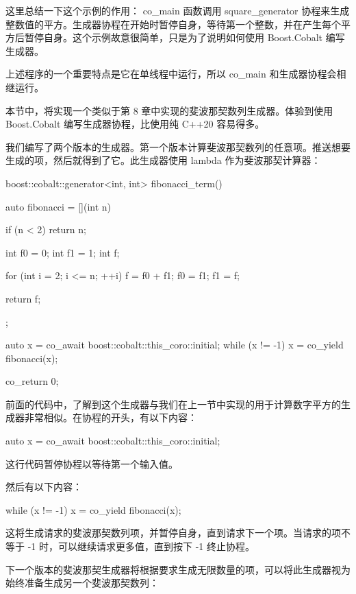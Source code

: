 这里总结一下这个示例的作用： co\_main 函数调用 square\_generator 协程来生成整数值的平方。生成器协程在开始时暂停自身，等待第一个整数，并在产生每个平方后暂停自身。这个示例故意很简单，只是为了说明如何使用 Boost.Cobalt 编写生成器。

上述程序的一个重要特点是它在单线程中运行，所以 co\_main 和生成器协程会相继运行。


本节中，将实现一个类似于第 8 章中实现的斐波那契数列生成器。体验到使用 Boost.Cobalt 编写生成器协程，比使用纯 C++20 容易得多。

我们编写了两个版本的生成器。第一个版本计算斐波那契数列的任意项。推送想要生成的项，然后就得到了它。此生成器使用 lambda 作为斐波那契计算器：

\begin{cpp}
boost::cobalt::generator<int, int> fibonacci_term() {
    auto fibonacci = [](int n) {
        if (n < 2) {
            return n;
        }

        int f0 = 0;
        int f1 = 1;
        int f;

        for (int i = 2; i <= n; ++i) {
            f = f0 + f1;
            f0 = f1;
            f1 = f;
        }

        return f;
    };

    auto x = co_await boost::cobalt::this_coro::initial;
    while (x != -1) {
        x = co_yield fibonacci(x);
    }

    co_return 0;
}
\end{cpp}

前面的代码中，了解到这个生成器与我们在上一节中实现的用于计算数字平方的生成器非常相似。在协程的开头，有以下内容：

\begin{cpp}
auto x = co_await boost::cobalt::this_coro::initial;
\end{cpp}

这行代码暂停协程以等待第一个输入值。

然后有以下内容：

\begin{cpp}
while (x != -1) {
    x = co_yield fibonacci(x);
}
\end{cpp}

这将生成请求的斐波那契数列项，并暂停自身，直到请求下一个项。当请求的项不等于 -1 时，可以继续请求更多值，直到按下 -1 终止协程。

下一个版本的斐波那契生成器将根据要求生成无限数量的项，可以将此生成器视为始终准备生成另一个斐波那契数列：

